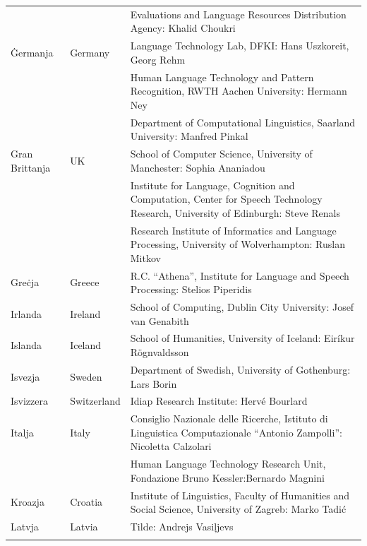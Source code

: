 \documentclass[]{../../metanetpaper}
\begin{document}
\begin{longtable}{@{}llp{113mm}@{}}
  & & Evaluations and Language Resources Distribution Agency: Khalid Choukri\\ \addlinespace 
  Ġermanja & \textcolor{grey1}{Germany} & Language Technology Lab, DFKI: Hans Uszkoreit, Georg Rehm\\ \addlinespace
  & & Human Language Technology and Pattern Recognition, RWTH Aachen University: Hermann Ney \\ \addlinespace
  & & Department of Computational Linguistics, Saarland University: Manfred Pinkal\\ \addlinespace 
  Gran Brittanja & \textcolor{grey1}{UK} & 
  School of Computer Science, University of Manchester: Sophia Ananiadou \\ \addlinespace 
  & & Institute for Language, Cognition and Computation, Center for Speech Technology Research, University of Edinburgh: Steve Renals \\ \addlinespace 
  & & Research Institute of Informatics and Language Processing, University of Wolverhampton: Ruslan Mitkov \\ \addlinespace 
  Greċja & \textcolor{grey1}{Greece} & R.C. “Athena”, Institute for Language and Speech Processing: Stelios Piperidis\\ \addlinespace
  Irlanda & \textcolor{grey1}{Ireland} & School of Computing, Dublin City University: Josef van Genabith\\ \addlinespace
  Islanda & \textcolor{grey1}{Iceland} & School of Humanities, University of Iceland: Eiríkur Rögnvaldsson\\ \addlinespace
  Isvezja & \textcolor{grey1}{Sweden} & Department of Swedish, University of Gothenburg: Lars Borin \\ \addlinespace 
  Isvizzera & \textcolor{grey1}{Switzerland} & Idiap Research Institute: Hervé Bourlard \\ \addlinespace 
  Italja & \textcolor{grey1}{Italy} & Consiglio Nazionale delle Ricerche, Istituto di Linguistica Computazionale “Antonio Zampolli”: Nicoletta Calzolari\\ \addlinespace
  & & Human Language Technology Research Unit, Fondazione Bruno Kessler:\newline Bernardo Magnini\\ \addlinespace 
  Kroazja & \textcolor{grey1}{Croatia} & Institute of Linguistics, Faculty of Humanities and Social Science, University of Zagreb: Marko Tadić \\ \addlinespace
  Latvja & \textcolor{grey1}{Latvia} & Tilde: Andrejs Vasiļjevs\\ \addlinespace 

\end{longtable}
\end{document}
